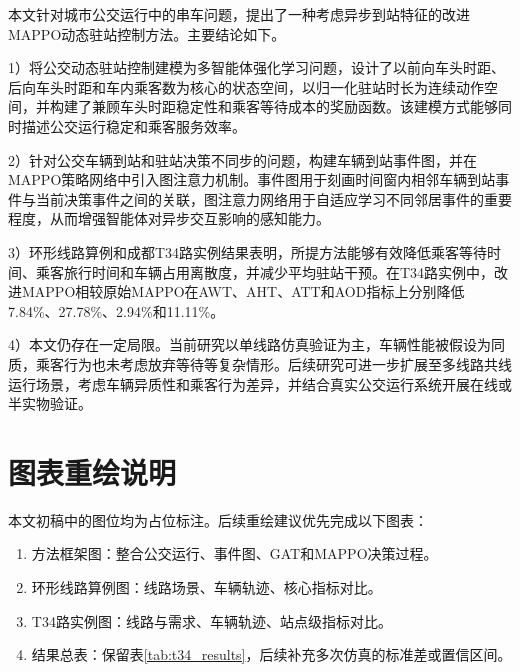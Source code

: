 \documentclass[UTF8,zihao=-4,fontset=none]{ctexart}
\begin{document}
本文针对城市公交运行中的串车问题，提出了一种考虑异步到站特征的改进MAPPO动态驻站控制方法。主要结论如下。

1）将公交动态驻站控制建模为多智能体强化学习问题，设计了以前向车头时距、后向车头时距和车内乘客数为核心的状态空间，以归一化驻站时长为连续动作空间，并构建了兼顾车头时距稳定性和乘客等待成本的奖励函数。该建模方式能够同时描述公交运行稳定和乘客服务效率。

2）针对公交车辆到站和驻站决策不同步的问题，构建车辆到站事件图，并在MAPPO策略网络中引入图注意力机制。事件图用于刻画时间窗内相邻车辆到站事件与当前决策事件之间的关联，图注意力网络用于自适应学习不同邻居事件的重要程度，从而增强智能体对异步交互影响的感知能力。

3）环形线路算例和成都T34路实例结果表明，所提方法能够有效降低乘客等待时间、乘客旅行时间和车辆占用离散度，并减少平均驻站干预。在T34路实例中，改进MAPPO相较原始MAPPO在AWT、AHT、ATT和AOD指标上分别降低7.84\%、27.78\%、2.94\%和11.11\%。

4）本文仍存在一定局限。当前研究以单线路仿真验证为主，车辆性能被假设为同质，乘客行为也未考虑放弃等待等复杂情形。后续研究可进一步扩展至多线路共线运行场景，考虑车辆异质性和乘客行为差异，并结合真实公交运行系统开展在线或半实物验证。

\section*{图表重绘说明}

本文初稿中的图位均为占位标注。后续重绘建议优先完成以下图表：

\begin{enumerate}
  \item 方法框架图：整合公交运行、事件图、GAT和MAPPO决策过程。
  \item 环形线路算例图：线路场景、车辆轨迹、核心指标对比。
  \item T34路实例图：线路与需求、车辆轨迹、站点级指标对比。
  \item 结果总表：保留表\ref{tab:t34_results}，后续补充多次仿真的标准差或置信区间。
\end{enumerate}
\end{document}
